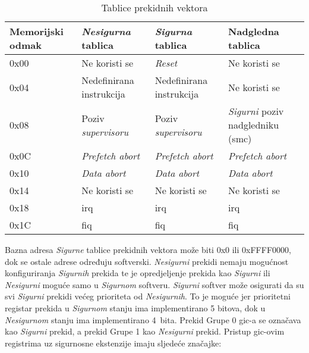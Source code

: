 \documentclass[times, utf8, diplomski, numeric]{fer}
\begin{document}
\begin{table}[H]
  \centering
  \caption{Tablice prekidnih vektora}
  \label{vector_table}
  \begin{tabular}{|| p{2cm} | p{3cm} | p{3cm} | p{3cm} ||}
    \hline
    \textbf{Memorijski odmak} & \textbf{\textit{Nesigurna} tablica} & \textbf{\textit{Sigurna} tablica} & \textbf{Nadgledna tablica} \\
    \hline\hline
    0x00 & Ne koristi se & \textit{Reset} & Ne koristi se\\
    \hline
    0x04 & Nedefinirana instrukcija & Nedefinirana instrukcija & Ne koristi se\\
    \hline
    0x08 & Poziv \textit{supervisoru} & Poziv \textit{supervisoru} & \textit{Sigurni} poziv nadgledniku (\gls{smc})\\
    \hline
    0x0C & \textit{Prefetch abort} & \textit{Prefetch abort} & \textit{Prefetch abort}\\
    \hline
    0x10 & \textit{Data abort} & \textit{Data abort} & \textit{Data abort}\\
    \hline
    0x14 & Ne koristi se & Ne koristi se & Ne koristi se\\
    \hline
    0x18 & \gls{irq} & \gls{irq} & \gls{irq}\\
    \hline
    0x1C & \gls{fiq} & \gls{fiq} & \gls{fiq}\\
    \hline
  \end{tabular}
\end{table}
Bazna adresa \textit{Sigurne} tablice prekidnih vektora može biti 0x0 ili 0xFFFF0000, dok se ostale adrese određuju softverski.
\textit{Nesigurni} prekidi nemaju mogućnost konfiguriranja \textit{Sigurnih} prekida te je opredjeljenje prekida kao \textit{Sigurni} ili \textit{Nesigurni}
moguće samo u \textit{Sigurnom} softveru. \textit{Sigurni} softver može osigurati da su svi \textit{Sigurni} prekidi većeg prioriteta od \textit{Nesigurnih}.
To je moguće jer prioritetni registar prekida u \textit{Sigurnom} stanju ima implementirano 5 bitova, dok u \textit{Nesigurnom} stanju ima
implementirano 4~bita.
Prekid Grupe 0 \gls{gic}-a se označava kao \textit{Sigurni} prekid, a prekid Grupe 1 kao \textit{Nesigurni} prekid. Pristup \gls{gic}-ovim registrima uz
sigurnosne ekstenzije imaju sljedeće značajke:
\end{document}
